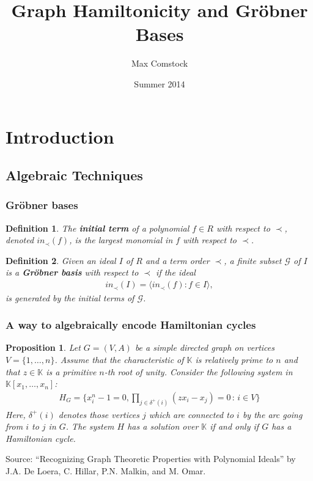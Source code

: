 \documentclass{beamer}
\title{Graph Hamiltonicity and Gr\"obner Bases}
\author{Max Comstock}
\date{Summer 2014}
\newtheorem*{prop}{Proposition}
\newtheorem*{defin}{Definition}
\newcommand{\aln}[1]{\begin{align*} #1 \end{align*}} %
\begin{document}
\frame{\titlepage}

\section{Introduction}

\subsection{Algebraic Techniques}

\begin{frame}
\frametitle{Gr\"obner bases}
\begin{defin}
The \textbf{initial term} of a polynomial $f \in R$ with respect to $\prec$, denoted $in_{\prec}(f)$, is the largest monomial in $f$ with respect to $\prec$.
\end{defin}
\begin{defin}
Given an ideal $I$ of $R$ and a term order $\prec$, a finite subset $\mathcal{G}$ of $I$ is a \textbf{Gr\"{o}bner basis} with respect to $\prec$ if the ideal
\aln{
in_{\prec}(I) = \langle in_{\prec}(f) : f \in I \rangle,
}
is generated by the initial terms of $\mathcal{G}$.
\end{defin}
\end{frame}

\begin{frame}
\frametitle{A way to algebraically encode Hamiltonian cycles}
\begin{prop}
  Let $G = (V,A)$ be a simple directed graph on vertices $V = \{1, \ldots, n\}$. Assume that the characteristic of $\mathbb{K}$ is relatively prime to $n$ and that $z \in \mathbb{K}$ is a primitive $n$-th root of unity. Consider the following system in $\mathbb{K}[x_1, \ldots, x_n]$:
  \begin{align*}
    H_G = \{x_i^n - 1 = 0, \prod_{j \in \delta^+(i)} (z x_i - x_j) = 0 \, : \, i \in V\}
  \end{align*}
  Here, $\delta^+(i)$ denotes those vertices $j$ which are connected to $i$ by the arc going from $i$ to $j$ in $G$. The system $H$ has a solution over $\mathbb{K}$ if and only if $G$ has a Hamiltonian cycle.
\end{prop}
Source: ``Recognizing Graph Theoretic Properties with Polynomial Ideals'' by J.A. De Loera, C. Hillar, P.N. Malkin, and M. Omar.
\end{frame}
\end{document}

